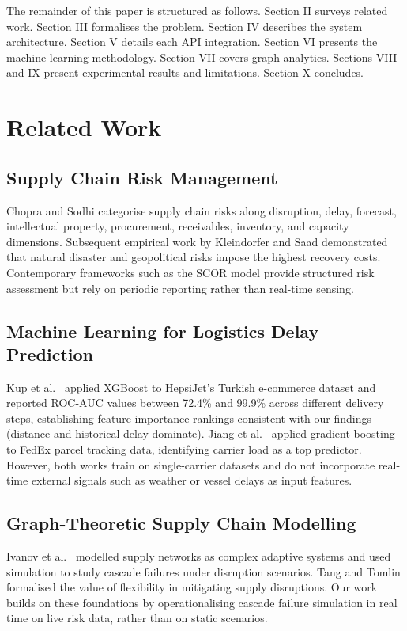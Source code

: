 \documentclass[conference]{IEEEtran}
\begin{document}
The remainder of this paper is structured as follows. Section II
surveys related work. Section III formalises the problem. Section IV
describes the system architecture. Section V details each API
integration. Section VI presents the machine learning methodology.
Section VII covers graph analytics. Sections VIII and IX present
experimental results and limitations. Section X concludes.


\section{Related Work}

\subsection{Supply Chain Risk Management}
Chopra and Sodhi \cite{chopra2004} categorise supply chain risks
along disruption, delay, forecast, intellectual property, procurement,
receivables, inventory, and capacity dimensions. Subsequent empirical
work by Kleindorfer and Saad \cite{kleindorfer2005} demonstrated
that natural disaster and geopolitical risks impose the highest
recovery costs. Contemporary frameworks such as the SCOR model
\cite{scor} provide structured risk assessment but rely on periodic
reporting rather than real-time sensing.

\subsection{Machine Learning for Logistics Delay Prediction}
Kup et al.\ \cite{kup2022} applied XGBoost to HepsiJet's Turkish
e-commerce dataset and reported ROC-AUC values between 72.4\% and
99.9\% across different delivery steps, establishing feature
importance rankings consistent with our findings (distance and
historical delay dominate). Jiang et al.\ \cite{jiang2019} applied
gradient boosting to FedEx parcel tracking data, identifying carrier
load as a top predictor. However, both works train on single-carrier
datasets and do not incorporate real-time external signals such as
weather or vessel delays as input features.

\subsection{Graph-Theoretic Supply Chain Modelling}
Ivanov et al.\ \cite{ivanov2016} modelled supply networks as complex
adaptive systems and used simulation to study cascade failures under
disruption scenarios. Tang and Tomlin \cite{tang2008} formalised the
value of flexibility in mitigating supply disruptions. Our work builds
on these foundations by operationalising cascade failure simulation
in real time on live risk data, rather than on static scenarios.
\end{document}
